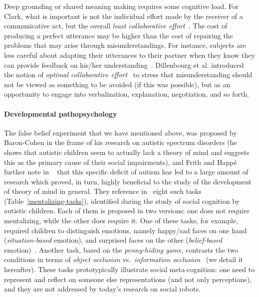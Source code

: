 \documentclass[11pt]{report}
\begin{document}
Deep grounding or shared meaning making requires some cognitive load. For Clark,
what is important is not the individual effort made by the receiver of a
communicative act, but the overall \emph{least collaborative
effort}~\cite{clark1986referring}.  The cost of producing a perfect utterance
may be higher than the cost of repairing the problems that may arise through
misunderstandings. For instance, subjects are less careful about adapting their
utterances to their partner when they know they can provide feedback on his/her
understanding~\cite{schober1993spatial}. Dillenbourg et al. introduced the
notion of \emph{optimal collaborative effort}~\cite{dillenbourg1995evolution} to
stress that misunderstanding should not be viewed as something to be avoided (if
this was possible), but as an opportunity to engage into verbalization,
explanation, negotiation, and so forth.



\paragraph{Developmental pathopsychology}

The false belief experiment that we have mentioned above, was proposed by
Baron-Cohen in the frame of his research on autistic spectrum disorders (he
shows that autistic children seem to actually lack a theory of mind and suggests
this as the primary cause of their social impairments), and Frith and Happé
further note in ~\cite{frith1994autism} that this specific deficit of autism has
led to a large amount of research which proved, in turn, highly beneficial to
the study of the development of theory of mind in general. They reference
in~\cite{frith1994autism} eight such tasks (Table~\ref{mentalizing-tasks}),
identified during the study of social cognition by autistic children. Each of
them is proposed in two versions: one does not require mentalizing, while the
other does require it.  One of these tasks, for example, required children to
distinguish emotions, namely happy/sad faces on one hand (\emph{situation-based}
emotion), and surprised faces on the other (\emph{belief-based}
emotion)~\cite{baron1993children}.  Another task, based on the
\emph{penny-hiding game}, contrasts the two conditions in terms of \emph{object
occlusion} vs.~\emph{information occlusion}~\cite{baron1992out} (we detail it
hereafter). These tasks prototypically illustrate social meta-cognition: one
need to represent and reflect on someone else representations (and not only
perceptions), and they are not addressed by today's research on social robots.
\end{document}
